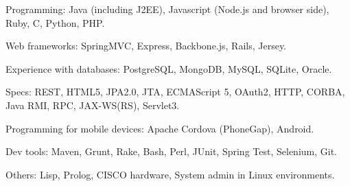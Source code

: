 \begin{rlist}
  \item Programming: Java (including J2EE), Javascript (Node.js and
  browser side), Ruby, C, Python, PHP.
  \item Web frameworks: SpringMVC, Express, Backbone.js, Rails, Jersey.
  \item Experience with databases: PostgreSQL, MongoDB, MySQL, SQLite, Oracle.
  \item Specs: REST, HTML5, JPA2.0, JTA, ECMAScript 5, OAuth2, HTTP,
  CORBA, Java RMI, RPC, JAX-WS(RS), Servlet3.
  \item Programming for mobile devices: Apache Cordova (PhoneGap),
  Android.
  \item Dev tools: Maven, Grunt, Rake, Bash, Perl, JUnit, Spring Test,
  Selenium, Git. 
  \item Others: Lisp, Prolog, CISCO hardware, System admin in Linux
  environments.
\end{rlist}

